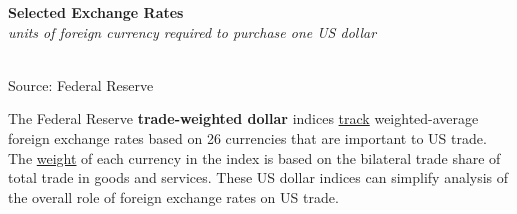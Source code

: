 \documentclass{report}
\makeatletter
\newcommand{\tbllink}[1]{\href{https://raw.githubusercontent.com/bdecon/US-chartbook/master/chartbook/data/#1}{\faTable}}
\newcommand*\short[1]{\expandafter\@gobbletwo\number\numexpr#1\relax}
\newcommand{\absnode}[3]{\node[below right, align=left] at (axis cs: #1,#2) {#3};}
\newcommand{\dateaxisticks}{
		date coordinates in=x, axis line style={draw=none},
		xmax={2022-03-15},
		max space between ticks=40,	    
		xtick={{1990-01-01}, {1992-01-01}, {1994-01-01}, 
			{1996-01-01}, {1998-01-01}, {2000-01-01}, 
			{2002-01-01}, {2004-01-01}, {2006-01-01},
			{2008-01-01}, {2010-01-01}, {2012-01-01}, {2014-01-01},
		    {2016-01-01}, {2018-01-01}, {2020-01-01}, {2022-01-01}, 
		    {2024-01-01}, {2026-01-01}},
		minor xtick={{1989-01-01}, {1991-01-01}, {1993-01-01},
			{1995-01-01}, {1997-01-01}, {1999-01-01}, 
			{2001-01-01}, {2003-01-01}, {2005-01-01}, {2007-01-01},
		    {2009-01-01}, {2011-01-01}, {2013-01-01}, {2015-01-01},
		    {2017-01-01}, {2019-01-01}, {2021-01-01}, {2023-01-01}, 
		    {2025-01-01}, {2027-01-01}},
		enlarge y limits={0.06}, enlarge x limits={0.01},
		}
\newcommand{\bbar}[2]{extra #1 ticks = {{#2}}, extra #1 tick labels = ,
		extra #1 tick style = {grid=major, grid style={thick, black!25}},}
\newcommand{\stdline}[4]{\addplot[very thick, no markers, color=#1] 
		table [x=#2, y=#3, col sep=comma] {#4};	}
\newcommand{\rbars}{
		\fill[color=black!10] (axis cs:{1990-07-01},\pgfkeysvalueof{/pgfplots/ymin}) rectangle 
			(axis cs:{1991-03-01}, \pgfkeysvalueof{/pgfplots/ymax});
		\fill[color=black!10] (axis cs:{2007-12-01},\pgfkeysvalueof{/pgfplots/ymin}) rectangle 
			(axis cs:{2009-07-01}, \pgfkeysvalueof{/pgfplots/ymax});
		\fill[color=black!10] (axis cs:{2001-03-01},\pgfkeysvalueof{/pgfplots/ymin}) rectangle 
			(axis cs:{2001-11-01}, \pgfkeysvalueof{/pgfplots/ymax});
		\fill[color=black!10] (axis cs:{2020-02-01},\pgfkeysvalueof{/pgfplots/ymin}) rectangle 
			(axis cs:{2020-05-01}, \pgfkeysvalueof{/pgfplots/ymax});}
\makeatother
\begin{document}
{\begin{minipage}{0.76\textwidth}
\normalsize \textbf{Selected Exchange Rates}\\
\footnotesize{\textit{units of foreign currency required to purchase one US dollar}}\\
\hspace*{-2mm} \\
\footnotesize{Source: Federal Reserve} \hfill \tbllink{fx1.csv}
\vspace{4mm} 

\small The Federal Reserve \textbf{trade-weighted dollar} indices \href{https://www.federalreserve.gov/releases/h10/summary/default.htm}{track} weighted-average foreign exchange rates based on 26 currencies that are important to US trade. The \href{https://www.federalreserve.gov/releases/h10/weights/default.htm}{weight} of each currency in the index is based on the bilateral trade share of total trade in goods and services. These US dollar indices can simplify analysis of the overall role of foreign exchange rates on US trade. 
\vspace{0.5mm}


\end{minipage}}
\end{document}
